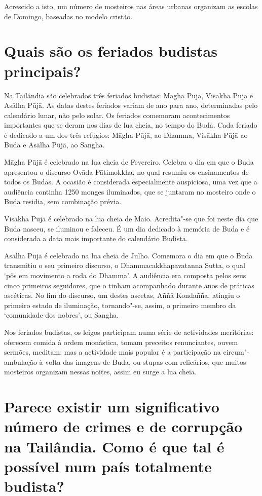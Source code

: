 Acrescido a isto, um número de mosteiros nas áreas urbanas organizam as
escolas de Domingo, baseadas no modelo cristão.

\section{Quais são os feriados budistas principais?}

\enlargethispage{\baselineskip}

Na Tailândia são celebrados três feriados budistas: Māgha Pūjā, Visākha
Pūjā e Asālha Pūjā. As datas destes feriados variam de ano para ano,
determinadas pelo calendário lunar, não pelo solar. Os feriados
comemoram acontecimentos importantes que se deram nos dias de lua cheia,
no tempo do Buda. Cada feriado é dedicado a um dos três refúgios: Māgha
Pūjā, ao Dhamma, Visākha Pūjā ao Buda e Asālha Pūjā, ao Sangha.

Māgha Pūjā é celebrado na lua cheia de Fevereiro. Celebra o dia em que o
Buda apresentou o discurso Ovāda Pātimokkha, no qual resumiu os
ensinamentos de todos os Budas. A ocasião é considerada especialmente
auspiciosa, uma vez que a audiência continha 1250 monges iluminados, que
se juntaram no mosteiro onde o Buda residia, sem combinação prévia.

Visākha Pūjā é celebrado na lua cheia de Maio. Acredita"-se que foi neste
dia que Buda nasceu, se iluminou e faleceu. É um dia dedicado à memória
de Buda e é considerada a data mais importante do calendário Budista.

Asālha Pūjā é celebrado na lua cheia de Julho. Comemora o dia em que o
Buda transmitiu o seu primeiro discurso, o Dhammacakkhapavatanna Sutta,
o qual `pôs em movimento a roda do Dhamma'. A audiência era composta
pelos seus cinco primeiros seguidores, que o tinham acompanhado durante
anos de práticas ascéticas. No fim do discurso, um destes ascetas, Aññā
Kondañña, atingiu o primeiro estado de iluminação, tornando"-se, assim, o
primeiro membro da `comunidade dos nobres', ou Sangha.

Nos feriados budistas, os leigos participam numa série de actividades
meritórias: oferecem comida à ordem monástica, tomam preceitos
renunciantes, ouvem sermões, meditam; mas a actividade mais popular é a
participação na circum"-ambulação à volta das imagens de Buda, ou stupas
com relicários, que muitos mosteiros organizam nessas noites, assim eu
surge a lua cheia.

\section{Parece existir um significativo número de crimes e de corrupção na
  Tailândia. Como é que tal é possível num país totalmente budista?}

